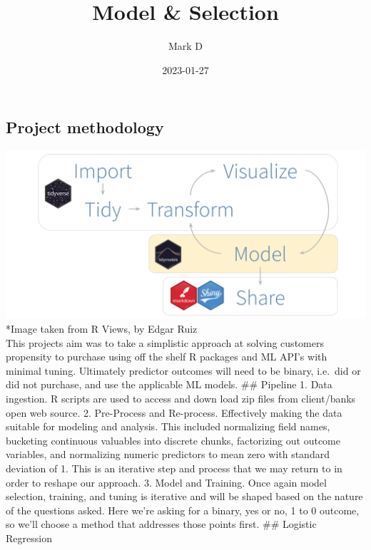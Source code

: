 \documentclass[
]{article}
\title{Model \& Selection}
\author{Mark D}
\date{2023-01-27}
\begin{document}
\maketitle

\hypertarget{project-methodology}{%
\subsection{Project methodology}\label{project-methodology}}

\includegraphics[width=50.22in]{pics/pipeline diagram} *Image taken from
R Views, by Edgar Ruiz\\
This projects aim was to take a simplistic approach at solving customers
propensity to purchase using off the shelf R packages and ML API's with
minimal tuning. Ultimately predictor outcomes will need to be binary,
i.e.~did or did not purchase, and use the applicable ML models. \#\#
Pipeline 1. Data ingestion. R scripts are used to access and down load
zip files from client/banks open web source. 2. Pre-Process and
Re-process. Effectively making the data suitable for modeling and
analysis. This included normalizing field names, bucketing continuous
valuables into discrete chunks, factorizing out outcome variables, and
normalizing numeric predictors to mean zero with standard deviation of
1. This is an iterative step and process that we may return to in order
to reshape our approach. 3. Model and Training. Once again model
selection, training, and tuning is iterative and will be shaped based on
the nature of the questions asked. Here we're asking for a binary, yes
or no, 1 to 0 outcome, so we'll choose a method that addresses those
points first. \#\# Logistic Regression
\end{document}
